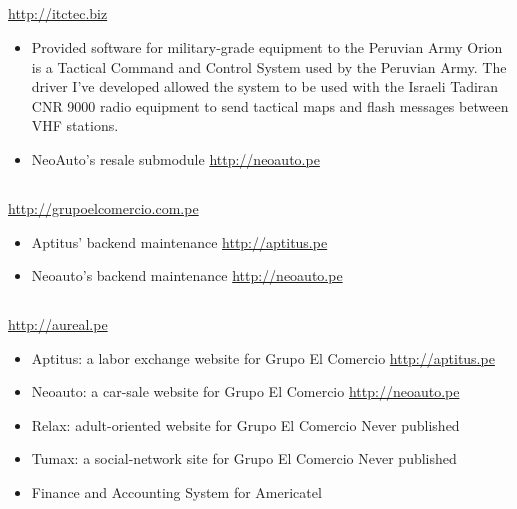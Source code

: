 \documentclass[11pt,a4paper,english]{moderncv}
\begin{document}
\subsection{}

{
\url{http://itctec.biz}
\newline{}
\begin{itemize}
    \item Provided software for military-grade equipment to the Peruvian Army
        \newline{}
        Orion is a Tactical Command and Control System used by the Peruvian Army. The driver I've developed allowed the system to be used with the Israeli Tadiran CNR 9000 radio equipment to send tactical maps and flash messages between VHF stations.
    \item NeoAuto's resale submodule
        \newline{}
        \url{http://neoauto.pe}
\end{itemize}
}

\subsection{}

{
\url{http://grupoelcomercio.com.pe}
\newline{}
\begin{itemize}
    \item Aptitus' backend maintenance
        \newline{}
        \url{http://aptitus.pe}
    \item Neoauto's backend maintenance
        \newline{}
        \url{http://neoauto.pe}
\end{itemize}
}

\subsection{}

{
\url{http://aureal.pe}
\newline{}
\begin{itemize}
    \item Aptitus: a labor exchange website for Grupo El Comercio
    \newline{}
    \url{http://aptitus.pe}
    \item Neoauto: a car-sale website for Grupo El Comercio
    \newline{}
    \url{http://neoauto.pe}
    \item Relax: adult-oriented website for Grupo El Comercio
    \newline{}
    Never published
    \item Tumax: a social-network site for Grupo El Comercio
    \newline{}
    Never published
    \item Finance and Accounting System for Americatel
\end{itemize}
}
\end{document}
